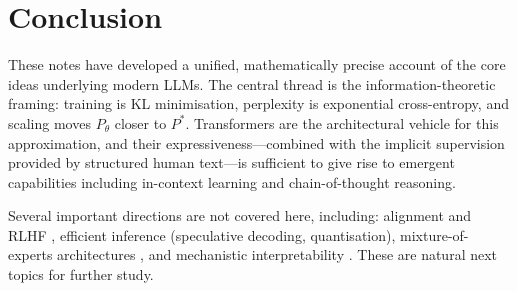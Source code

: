 \documentclass[11pt,a4paper]{article}
\theoremstyle{definition}
\theoremstyle{plain}
\begin{document}
\section{Conclusion}

These notes have developed a unified, mathematically precise account of the
core ideas underlying modern LLMs.
The central thread is the information-theoretic framing: training is KL minimisation,
perplexity is exponential cross-entropy, and scaling moves $P_\theta$ closer to $P^*$.
Transformers are the architectural vehicle for this approximation, and their
expressiveness---combined with the implicit supervision provided by structured
human text---is sufficient to give rise to emergent capabilities including
in-context learning and chain-of-thought reasoning.

Several important directions are not covered here, including:
alignment and RLHF \cite{ouyang2022instructgpt},
efficient inference (speculative decoding, quantisation),
mixture-of-experts architectures \cite{fedus2022switch},
and mechanistic interpretability \cite{elhage2021mathematical}.
These are natural next topics for further study.
\end{document}
